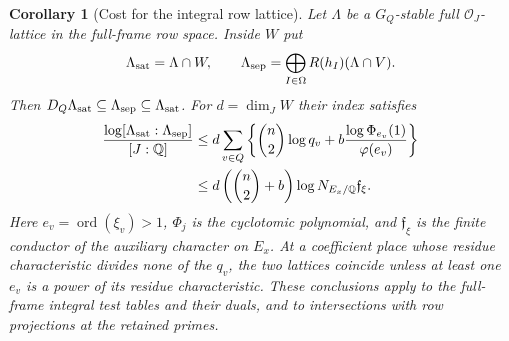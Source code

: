 \documentclass[a4paper,11pt]{article}
\newtheorem{corollary}[proposition]{Corollary}
\theoremstyle{definition}
\theoremstyle{remark}
\numberwithin{equation}{section}
\begin{document}
\begin{corollary}[Cost for the integral row lattice]
\leavevmode\label{cor:flagcost383}
Let \(\Lambda\) be a \(G_Q\)-stable full \(\mathcal O_J\)-lattice
in the full-frame row space. Inside \(W\) put
\[
 \Lambda_{\rm sat}=\Lambda\cap W,\qquad
 \Lambda_{\rm sep}=\bigoplus_{I\in\Omega}R(h_I)(\Lambda\cap V).
\]
Then \(D_Q\Lambda_{\rm sat}\subseteq\Lambda_{\rm sep}
\subseteq\Lambda_{\rm sat}\). For \(d=\dim_J W\) their
index satisfies
\begin{align*}
 \frac{\log[\Lambda_{\rm sat}:\Lambda_{\rm sep}]}{[J:\mathbb Q]}
 &\le d\sum_{v\in Q}\left\{\binom n2\log q_v+
       b\frac{\log\Phi_{e_v}(1)}{\varphi(e_v)}\right\} \\
 &\le d\left(\binom n2+b\right)\log N_{E_x/\mathbb Q}\mathfrak f_\xi .
\end{align*}
Here \(e_v=\operatorname{ord}(\xi_v)>1\), \(\Phi_j\) is the
cyclotomic polynomial, and \(\mathfrak f_\xi\) is the finite
conductor of the auxiliary character on \(E_x\). At a coefficient place
whose residue characteristic divides none of the \(q_v\), the two lattices coincide unless
at least one \(e_v\) is a power of its residue characteristic.
These conclusions apply to the full-frame integral test tables
and their duals, and to intersections with row projections at
the retained primes.
\end{corollary}
\end{document}
